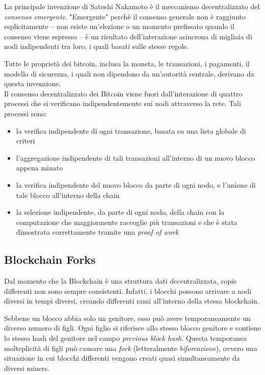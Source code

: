 La principale invenzione di Satoshi Nakamoto è il meccanismo decentralizzato del \textit{consenso emergente}. "Emergente" perchè il consenso generale non è raggiunto esplicitamente -- non esiste un'elezione o un momento prefissato quando il consenso viene espresso -- è un risultato dell'interazione asincrona di migliaia di nodi indipendenti tra loro, i quali basati sulle stesse regole.

Tutte le proprietà dei bitcoin, inclusa la moneta, le transazioni, i pagamenti, il modello di sicurezza, i quali non dipendono da un'autorità centrale, derivano da questa invenzione.\\
Il consenso decentralizzato dei Bitcoin viene fuori dall'interazione di quattro processi che si verificano indipendentemente sui nodi attraverso la rete. Tali processi sono:
\begin{itemize}
	\item la verifica indipendente di ogni transazione, basata su una lista globale di criteri
	\item  l'aggregazione indipendente di tali transazioni all'interno di un nuovo blocco appena minato
	\item la verifica indipendente del nuovo blocco da parte di ogni nodo, e l'unione di tale blocco all'interno della chain
	\item la selezione indipendente, da parte di ogni nodo, della chain con la computazione che maggiormente raccoglie più transazioni e che è stata dimostrata correttamente tramite una \textit{proof of work}
\end{itemize}

\subsection{Blockchain Forks}

Dal momento che la Blockchain è una struttura dati decentralizzata, copie differenti non sono sempre consistenti. Infatti, i blocchi possono arrivare a nodi diversi in tempi diversi, creando differenti rami all'interno della stessa blockchain.

Sebbene un blocco abbia solo un genitore, esso può avere temporaneamente un diverso numero di figli. Ogni figlio si riferisce allo stesso blocco genitore e contiene lo stesso hash del genitore nel campo  \textit{previous block hash}. Questa temporanea molteplicità di figli può causare una \textit{fork} (letteralmente \textit{biforcazione}), ovvero una situazione in cui blocchi differenti vengono creati quasi simultaneamente da diversi miners.

